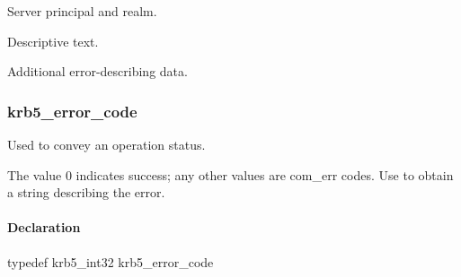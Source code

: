 \documentclass[letterpaper,10pt,english]{sphinxmanual}
\begin{document}

\begin{fulllineitems}
\label{appdev/refs/types/krb5_error:c.krb5_error.server}
Server principal and realm.

\end{fulllineitems}


\begin{fulllineitems}
\label{appdev/refs/types/krb5_error:c.krb5_error.text}
Descriptive text.

\end{fulllineitems}


\begin{fulllineitems}
\label{appdev/refs/types/krb5_error:c.krb5_error.e_data}
Additional error-describing data.

\end{fulllineitems}



\subsubsection{krb5\_error\_code}
\label{appdev/refs/types/krb5_error_code:krb5-error-code}\label{appdev/refs/types/krb5_error_code::doc}\label{appdev/refs/types/krb5_error_code:krb5-error-code-struct}

\begin{fulllineitems}
\label{appdev/refs/types/krb5_error_code:c.krb5_error_code}
\end{fulllineitems}


Used to convey an operation status.

The value 0 indicates success; any other values are com\_err codes. Use {\hyperref[appdev/refs/api/krb5_get_error_message:c.krb5_get_error_message]{}} to obtain a string describing the error.


\paragraph{Declaration}
\label{appdev/refs/types/krb5_error_code:declaration}
typedef krb5\_int32 krb5\_error\_code
\end{document}
